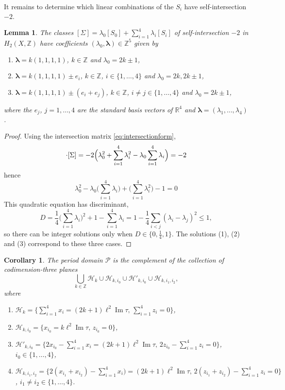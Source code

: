 \documentclass[12pt,letterpaper,reqno]{amsart}
\newtheorem{cor}[thm]{Corollary}
\newtheorem{lem}[thm]{Lemma}
\theoremstyle{remark}
\theoremstyle{definition}
\numberwithin{thm}{section}
\numberwithin{equation}{section}
\numberwithin{figure}{section}
\newcommand{\R}{\ensuremath{\mathbb R}}
\newcommand{\Z}{\ensuremath{\mathbb Z}}
\newcommand{\calH}{\mathcal H}
\newcommand{\calP}{\mathcal P}
\DeclareMathOperator{\im}{Im}
\begin{document}
It remains to determine which linear combinations of the $S_i$ have self-intersection $-2$.
\begin{lem}
The classes $[\Sigma] = \lambda_0  [S_0] + \sum_{i=1}^4 \lambda_i [S_i]$ of self-intersection $-2$ in $H_2(X, \Z)$ have
coefficients $(\lambda_0, \boldsymbol{\lambda}) \in \Z^5$ given by 
\begin{enumerate}
\item $\boldsymbol{\lambda} = k (1,1,1,1)$, $k \in \Z$ and $\lambda_0 = 2k \pm 1$,
\smallskip \
\item $\boldsymbol{\lambda} = k (1,1,1,1) \pm e_i$, $k \in \Z$, $i \in \{1, \ldots, 4\}$ and $\lambda_0 = 2k, 2k \pm 1$,
\smallskip
\item $\boldsymbol{\lambda} = k (1,1,1,1) \pm (e_i+e_j)$, $k \in \Z$, $ i \neq j \in \{1, \ldots, 4\}$ and $\lambda_0 =  2k \pm 1$,
\end{enumerate}
where the $e_j$, $j = 1, \ldots, 4$ are the standard basis vectors of $\R^4$ and $\boldsymbol{\lambda} = (\lambda_1, \ldots, \lambda_4)$.
\end{lem}
\begin{proof}
Using the intersection matrix \eqref{eq:intersectionform}, 
\begin{align*}
[\Sigma]\cdot [\Sigma] = -2 \Bigl( \lambda_0^2 +\sum_{i=1}^4 \lambda_i^2 - \lambda_0 \sum_{i=1}^4 \lambda_i \Bigr) = -2
\end{align*}
hence
\[
\lambda_0^2 - \lambda_0 \bigl(\sum_{i=1}^4 \lambda_i\bigr) + \bigl( \sum_{i=1}^4 \lambda_i^2)- 1 =0 
\]
This quadratic equation has discriminant,
\[
D = \frac{1}{4} \bigl(\sum_{i=1}^4 \lambda_i\bigr)^2 +1 -  \sum_{i=1}^4 \lambda_i  = 1 - \frac{1}{4} \sum_{i<j} (\lambda_i-\lambda_j)^2 \leq 1,
\]
so there can be integer solutions only when $D \in \{0, \frac{1}{4}, 1\}$. The solutions (1), (2) and (3) correspond to these three cases.
\end{proof}
\begin{cor}\label{cor:descriptionofP}
The period domain $\calP$ is the complement of the collection of codimension-three planes
\[
\bigcup_{k \in \Z} \calH_k \cup \calH_{k,i_0} \cup \calH'_{k,i_0} \cup \calH_{k, i_1, i_2},
\]
where
\begin{enumerate}
\item[(1)] $\mathcal{H}_k = \{ \sum_{i=1}^4 x_i =(2k+1) \ell^2 \im\tau, \, \sum_{i=1}^4 z_i =0 \} $, 
\smallskip 
\item[(2)] $\mathcal{H}_{k,i_0} = \{ x_{i_0} = k \ell^2 \im \tau, \,z_{i_0} = 0 \}$, 
\smallskip
\item[] $\mathcal{H}'_{k,i_0} = \{ 2x_{i_0} - \sum_{i=1}^4 x_i = (2k+1) \ell^2 \im\tau, \, 2 z_{i_0} - \sum_{i=1}^4 z_i = 0 \}$,  $i_0 \in \{1, \ldots ,4\}$,
\smallskip
\item[(3)] $\mathcal{H}_{k,i_1, i_2}= \{ 2 (x_{i_1} + x_{i_2}) -\sum_{i=1}^4 x_i)  = (2k + 1) \ell^2 \im\tau, \, 2 (z_{i_1} + z_{i_2}) -\sum_{i=1}^4 z_i = 0 \}$, 
$i_1 \neq i_2 \in \{1, \ldots , 4 \}$.
\end{enumerate}
\end{cor}
\end{document}
